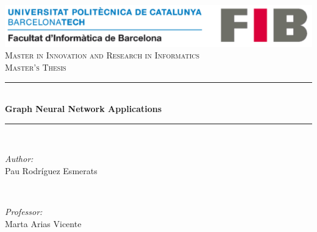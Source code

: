 \begin{titlepage}

\newcommand{\HRule}{\rule{\linewidth}{0.5mm}} 							%
\newenvironment{bottompar}{\par\vspace*{\fill}}{\clearpage}
\center 
\begin{center}
\includegraphics[scale=0.8]{./img/upclogo.png}\\[2cm] %
 
\textsc{\Large Master in Innovation and Research in Informatics}\\[0.5cm] %
\textsc{\large Master's Thesis}\\[5cm] %


\HRule \\[0.4cm]
{ \huge \bfseries Graph Neural Network Applications}\\[0.4cm] %
\HRule \\[1.5cm]
 
\begin{bottompar}
\begin{minipage}{0.5\textwidth}
\begin{flushleft} \large
\emph{Author:}\\ Pau Rodríguez Esmerats %
\end{flushleft}
\end{minipage}
~
\begin{minipage}{0.4\textwidth}
\begin{flushright} \large
\emph{Professor:} \\
 Marta Arias Vicente   %
\end{flushright}
\end{minipage}\\[2cm]


\end{bottompar}
\end{center}
\end{titlepage}
